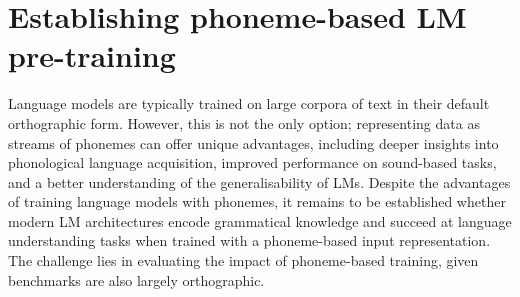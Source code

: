 \chapter{Establishing phoneme-based LM pre-training}\label{chapter:modelling}

Language models are typically trained on large corpora of text in their default orthographic form. However, this is not the only option; representing data as streams of phonemes can offer unique advantages, including deeper insights into phonological language acquisition, improved performance on sound-based tasks, and a better understanding of the generalisability of LMs. Despite the advantages of training language models with phonemes, it remains to be established whether modern LM architectures encode grammatical knowledge and succeed at language understanding tasks when trained with a phoneme-based input representation. The challenge lies in evaluating the impact of phoneme-based training, given benchmarks are also largely orthographic. 



